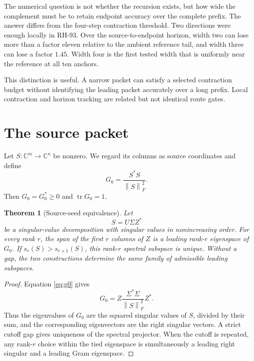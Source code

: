 \documentclass[11pt]{article}
\newtheorem{theorem}{Theorem}[section]
\theoremstyle{definition}
\theoremstyle{remark}
\newcommand{\norm}[1]{\left\lVert#1\right\rVert}
\newcommand{\tr}{\operatorname{tr}}
\begin{document}
The numerical question is not whether the recursion exists, but how wide the
complement must be to retain endpoint accuracy over the complete prefix.  The
answer differs from the four-step contraction threshold.  Two directions were
enough locally in RH-93.  Over the source-to-endpoint horizon, width two can
lose more than a factor eleven relative to the ambient reference tail, and
width three can lose a factor $1.45$.  Width four is the first tested width
that is uniformly near the reference at all ten anchors.

This distinction is useful.  A narrow packet can satisfy a selected
contraction budget without identifying the leading packet accurately over a
long prefix.  Local contraction and horizon tracking are related but not
identical route gates.

\section{The source packet}
\label{sec:source}

Let $S:\mathbb C^m\to\mathbb C^n$ be nonzero.  We regard its columns as source
coordinates and define
\begin{equation}
 G_0=\frac{S^*S}{\norm S_F^2}.
 \label{eq:g0}
\end{equation}
Then $G_0=G_0^*\ge0$ and $\tr G_0=1$.

\begin{theorem}[Source-seed equivalence]
\label{thm:source-seed}
Let
\[
 S=U\Sigma Z^*
\]
be a singular-value decomposition with singular values in nonincreasing
order.  For every rank $r$, the span of the first $r$ columns of $Z$ is a
leading rank-$r$ eigenspace of $G_0$.  If
$s_r(S)>s_{r+1}(S)$, this rank-$r$ spectral subspace is unique.  Without a
gap, the two constructions determine the same family of admissible leading
subspaces.
\end{theorem}

\begin{proof}
Equation \eqref{eq:g0} gives
\[
 G_0=Z\frac{\Sigma^*\Sigma}{\norm S_F^2}Z^*.
\]
Thus the eigenvalues of $G_0$ are the squared singular values of $S$, divided
by their sum, and the corresponding eigenvectors are the right singular
vectors.  A strict cutoff gap gives uniqueness of the spectral projector.
When the cutoff is repeated, any rank-$r$ choice within the tied eigenspace is
simultaneously a leading right singular and a leading Gram eigenspace.
\end{proof}
\end{document}
